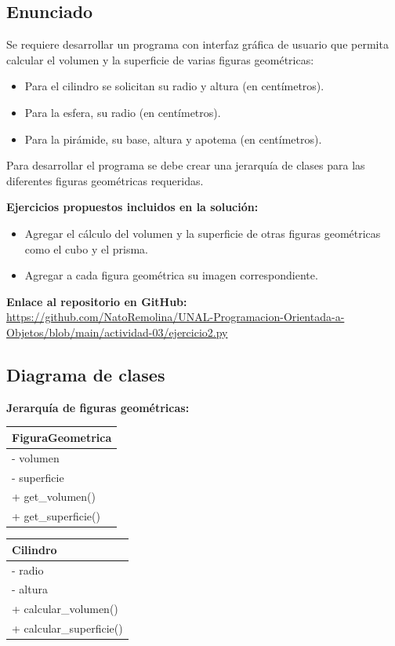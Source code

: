 \documentclass[11pt, a4paper]{article}
\newcommand{\clasebox}[3]{%
\begin{center}
\begin{tabular}{|l|}
\hline
\textbf{#1} \\
\hline
#2
\hline
#3
\hline
\end{tabular}
\end{center}
}
\begin{document}
\subsection{Enunciado}
Se requiere desarrollar un programa con interfaz gráfica de usuario que permita calcular el
volumen y la superficie de varias figuras geométricas:

\begin{itemize}
    \item Para el cilindro se solicitan su radio y altura (en centímetros).
    \item Para la esfera, su radio (en centímetros).
    \item Para la pirámide, su base, altura y apotema (en centímetros).
\end{itemize}

\noindent Para desarrollar el programa se debe crear una jerarquía de clases para las
diferentes figuras geométricas requeridas.

\noindent \textbf{Ejercicios propuestos incluidos en la solución:}
\begin{itemize}
    \item Agregar el cálculo del volumen y la superficie de otras figuras geométricas
          como el cubo y el prisma.
    \item Agregar a cada figura geométrica su imagen correspondiente.
\end{itemize}

\noindent \textbf{Enlace al repositorio en GitHub:} \\
\url{https://github.com/NatoRemolina/UNAL-Programacion-Orientada-a-Objetos/blob/main/actividad-03/ejercicio2.py}

\subsection{Diagrama de clases}

\noindent \textbf{Jerarquía de figuras geométricas:}

\clasebox{FiguraGeometrica}
{%
- volumen \\
- superficie \\
}
{%
+ get\_volumen() \\
+ get\_superficie() \\
}

\clasebox{Cilindro}
{%
- radio \\
- altura \\
}
{%
+ calcular\_volumen() \\
+ calcular\_superficie() \\
}
\end{document}
